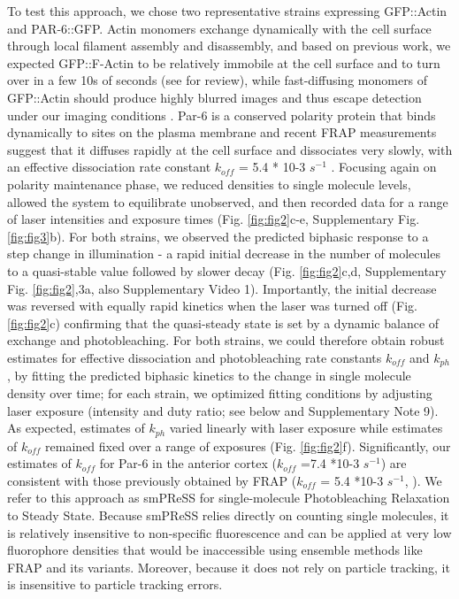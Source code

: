  
 
 
 
 To test this approach, we chose two representative strains expressing GFP::Actin and PAR-6::GFP. Actin monomers exchange dynamically with the cell surface through local filament assembly and disassembly, and based on previous work, we expected GFP::F-Actin to be relatively immobile at the cell surface and to turn over in a few 10s of seconds (see \cite{nmeth21} for review), while fast-diffusing monomers of GFP::Actin should produce highly blurred images and thus escape detection under our imaging conditions \cite{nmeth6}. Par-6 is a conserved polarity protein that binds dynamically to sites on the plasma membrane \cite{nmeth22,nmeth23,nmeth24} and recent FRAP measurements suggest that it diffuses rapidly at the cell surface and dissociates very slowly, with an effective dissociation rate constant $k_{off}$ = 5.4 * 10-3 $s^{-1}$ \cite{nmeth25}. Focusing again on polarity maintenance phase, we reduced densities to single molecule levels, allowed the system to equilibrate unobserved, and then recorded data for a range of laser intensities and exposure times (Fig. \ref{fig:fig2}c-e, Supplementary Fig. \ref{fig:fig3}b). For both strains, we observed the predicted biphasic response to a step change in illumination - a rapid initial decrease in the number of molecules to a quasi-stable value followed by slower decay (Fig. \ref{fig:fig2}c,d, Supplementary Fig. \ref{fig:fig2},3a, also Supplementary Video 1). Importantly, the initial decrease was reversed with equally rapid kinetics when the laser was turned off (Fig. \ref{fig:fig2}c) confirming that the quasi-steady state is set by a dynamic balance of exchange and photobleaching. For both strains, we could therefore obtain robust estimates for effective dissociation and photobleaching rate constants $k_{off}$ and $k_{ph}$, by fitting the predicted biphasic kinetics to the change in single molecule density over time; for each strain, we optimized fitting conditions by adjusting laser exposure (intensity and duty ratio; see below and Supplementary Note 9). As expected, estimates of $k_{ph}$ varied linearly with laser exposure while estimates of $k_{off}$ remained fixed over a range of exposures (Fig. \ref{fig:fig2}f). Significantly, our estimates of $k_{off}$ for Par-6 in the anterior cortex ($k_{off}$ =7.4 *10-3 $s^{-1}$) are consistent with those previously obtained by FRAP ($k_{off}$ = 5.4 *10-3 $s^{-1}$, \cite{nmeth25}). We refer to this approach as smPReSS for single-molecule Photobleaching Relaxation to Steady State. Because smPReSS relies directly on counting single molecules, it is relatively insensitive to non-specific fluorescence and can be applied at very low fluorophore densities that would be inaccessible using ensemble methods like FRAP and its variants. Moreover, because it does not rely on particle tracking, it is insensitive to particle tracking errors.
 
